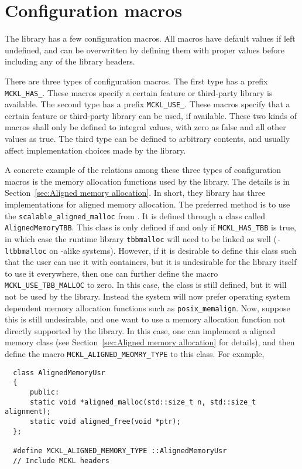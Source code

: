 \chapter{Configuration macros}
\label{chap:Configuration macros}

The library has a few configuration macros. All macros have default values if
left undefined, and can be overwritten by defining them with proper values
before including any of the library headers.

There are three types of configuration macros. The first type has a prefix
\verb|MCKL_HAS_|. These macros specify a certain feature or third-party library
is available. The second type has a prefix \verb|MCKL_USE_|. These macros
specify that a certain feature or third-party library can be used, if
available. These two kinds of macros shall only be defined to integral values,
with zero as false and all other values as true. The third type can be defined
to arbitrary contents, and usually affect implementation choices made by the
library.

A concrete example of the relations among these three types of configuration
macros is the memory allocation functions used by the library. The details is
in Section~\ref{sec:Aligned memory allocation}. In short, they library has
three implementations for aligned memory allocation. The preferred method is to
use the \verb|scalable_aligned_malloc| from \tbb. It is defined through a class
called \verb|AlignedMemoryTBB|. This class is only defined if and only if
\verb|MCKL_HAS_TBB| is true, in which case the runtime library \verb|tbbmalloc|
will need to be linked as well (\verb|-ltbbmalloc| on \unix-alike systems).
However, if it is desirable to define this class such that the user can use it
with \stl containers, but it is undesirable for the library itself to use it
everywhere, then one can further define the macro \verb|MCKL_USE_TBB_MALLOC| to
zero. In this case, the class is still defined, but it will not be used by the
library. Instead the system will now prefer operating system dependent memory
allocation functions such as \verb|posix_memalign|. Now, suppose this is still
undesirable, and one want to use a memory allocation function not directly
supported by the library. In this case, one can implement a aligned memory
class (see Section~\ref{sec:Aligned memory allocation} for details), and then
define the macro \verb|MCKL_ALIGNED_MEOMRY_TYPE| to this class. For example,
\begin{Verbatim}
  class AlignedMemoryUsr
  {
      public:
      static void *aligned_malloc(std::size_t n, std::size_t alignment);
      static void aligned_free(void *ptr);
  };

  #define MCKL_ALIGNED_MEMORY_TYPE ::AlignedMemoryUsr
  // Include MCKL headers
\end{Verbatim}

